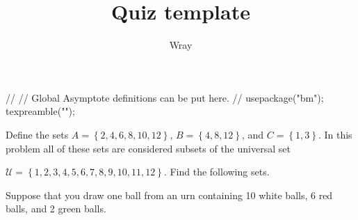 \documentclass[addpoints, 12pt]{exam}
\title{Quiz template}
\author{Wray}
\begin{document}
\begin{asydef}
//
// Global Asymptote definitions can be put here.
//
usepackage("bm");
texpreamble("\def\V#1{\bm{#1}}");
\end{asydef}



\bigskip

             
\bigskip
\bigskip

\smallskip

\begin{questions}

\question[10]
Define the sets $A = \left\lbrace 2, 4, 6, 8, 10, 12  \right\rbrace$,
$B = \left\lbrace 4, 8, 12 \right\rbrace$, and $C = \left\lbrace 1,3 \right\rbrace$.
In this problem all of these sets are considered subsets of the universal set 

$\mathcal{U} = \left\lbrace 1, 2, 3, 4, 5, 6, 7, 8, 9, 10, 11, 12 \right\rbrace$.  Find the following sets.

\newpage

\question[10]
Suppose that you draw one ball from an urn containing 10 white balls, 6 red balls, and 2 green balls.


\end{questions}
\end{document}
